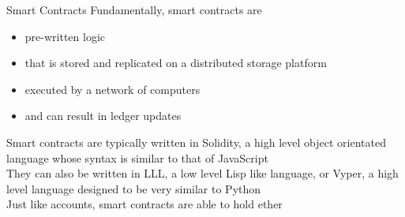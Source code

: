 \documentclass[11pt]{beamer}
\begin{document}



\begin{frame}{Smart Contracts}
	Fundamentally, smart contracts are
	\begin{itemize}
		\item pre-written logic
		\item that is stored and replicated on a distributed storage platform
		\item executed by a network of computers
		\item and can result in ledger updates
	\end{itemize}
	Smart contracts are typically written in Solidity, a high level object orientated language whose syntax is similar to that of JavaScript \\ \vspace{3mm}
	They can also be written in LLL, a low level Lisp like language, or Vyper, a high level language designed to be very similar to Python \\ \vspace{3mm}
	Just like accounts, smart contracts are able to hold ether
\end{frame}

\end{document}
